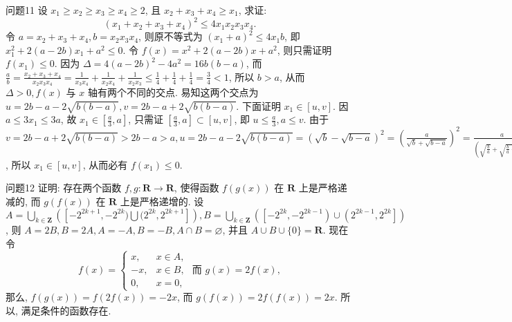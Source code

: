 问题11 设 $x_1 \geqslant x_2 \geqslant x_3 \geqslant x_4 \geqslant 2$, 且 $x_2+x_3+x_4 \geqslant x_1$, 求证:
$$
\left(x_1+x_2+x_3+x_4\right)^2 \leqslant 4 x_1 x_2 x_3 x_4 .
$$
令 $a=x_2+x_3+x_4, b=x_2 x_3 x_4$, 则原不等式为 $\left(x_1+a\right)^2 \leqslant 4 x_1 b$, 即 $x_1^2+2(a-2 b) x_1+a^2 \leqslant 0$. 令 $f(x)=x^2+2(a-2 b) x+a^2$, 则只需证明 $f\left(x_1\right) \leqslant 0$. 因为 $\Delta=4(a-2 b)^2-4 a^2=16 b(b-a)$, 而 $\frac{a}{b}=\frac{x_2+x_3+x_4}{x_2 x_3 x_4}= \frac{1}{x_3 x_4}+\frac{1}{x_2 x_4}+\frac{1}{x_2 x_3} \leqslant \frac{1}{4}+\frac{1}{4}+\frac{1}{4}=\frac{3}{4}<1$, 所以 $b>a$, 从而 $\Delta>0, f(x)$ 与 $x$ 轴有两个不同的交点.
易知这两个交点为 $u=2 b-a-2 \sqrt{b(b-a)}, v= 2 b-a+2 \sqrt{b(b-a)}$. 下面证明 $x_1 \in[u, v]$. 因 $a \leqslant 3 x_1 \leqslant 3 a$, 故 $x_1 \in \left[\frac{a}{3}, a\right]$, 只需证 $\left[\frac{a}{3}, a\right] \subset[u, v]$, 即 $u \leqslant \frac{a}{3}, a \leqslant v$. 由于 $v=2 b-a+2 \sqrt{b(b-a)}>2 b-a>a, u=2 b-a-2 \sqrt{b(b-a)}=(\sqrt{b}-\sqrt{b-a})^2= \left(\frac{a}{\sqrt{b}+\sqrt{b-a}}\right)^2=\frac{a}{\left(\sqrt{\frac{b}{a}}+\sqrt{\frac{b}{a}-1}\right)^2} \leqslant \frac{a}{\left(\sqrt{\frac{4}{3}}+\sqrt{\frac{1}{3}}\right)^2}=\frac{a}{3}$, 所以 $x_1 \in[u, v]$, 从而必有 $f\left(x_1\right) \leqslant 0$.



问题12 证明: 存在两个函数 $f, g: \mathbf{R} \rightarrow \mathbf{R}$, 使得函数 $f(g(x))$ 在 $\mathbf{R}$ 上是严格递减的, 而 $g(f(x))$ 在 $\mathbf{R}$ 上是严格递增的.
设 $A=\bigcup_{k \in \mathbf{Z}}\left([-2^{2 k+1},-2^{2 k}) \bigcup(2^{2 k}, 2^{2 k+1}]\right), B=\bigcup_{k \in \mathbf{Z}}\left(\left[-2^{2 k},-2^{2 k-1}\right) \cup\left(2^{2 k-1}, 2^{2 k}\right]\right)$, 则 $A=2 B, B=2 A, A=-A, B=-B, A \cap B=\varnothing$, 并且 $A \cup B \cup\{0\}=\mathbf{R}$. 现在令
$$
f(x)=\left\{\begin{array}{ll}
x, & x \in A, \\
-x, & x \in B, \\
0, & x=0,
\end{array} \text { 而 } g(x)=2 f(x),\right.
$$
那么, $f(g(x))=f(2 f(x))=-2 x$, 而 $g(f(x))=2 f(f(x))=2 x$. 所以, 满足条件的函数存在.



